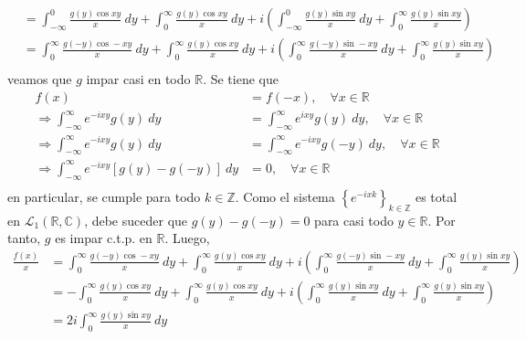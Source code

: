 \documentclass[12pt]{report}
\newcounter{it}
\theoremstyle{largebreak}
\begin{document}
\begin{sol}
\begin{equation*}
\begin{split}
                &=\int_{-\infty}^{0}\frac{g(y)\cos xy}{x}\:dy+\int_{0}^{\infty}\frac{g(y)\cos xy}{x}\:dy+i\left(\int_{-\infty}^{0}\frac{g(y)\sin xy}{x}\:dy+\int_{0}^{\infty}\frac{g(y)\sin xy}{x}\right)\\
                &=\int_{0}^{\infty}\frac{g(-y)\cos -xy}{x}\:dy+\int_{0}^{\infty}\frac{g(y)\cos xy}{x}\:dy+i\left(\int_{0}^{\infty}\frac{g(-y)\sin -xy}{x}\:dy+\int_{0}^{\infty}\frac{g(y)\sin xy}{x}\right)\\
            \end{split}
        \end{equation*}
        veamos que $g$ impar casi en todo $\mathbb{R}$. Se tiene que
        \begin{equation*}
            \begin{split}
                f(x)&=f(-x),\quad\forall x\in\mathbb{R}\\
                \Rightarrow \int_{-\infty}^{\infty}e^{ -ixy}g(y)\:dy&=\int_{-\infty}^{\infty}e^{ ixy}g(y)\:dy,\quad\forall x\in\mathbb{R}\\
                \Rightarrow \int_{-\infty}^{\infty}e^{ -ixy}g(y)\:dy&=\int_{-\infty}^{\infty}e^{-ixy}g(-y)\:dy,\quad\forall x\in\mathbb{R}\\
                \Rightarrow \int_{-\infty}^{\infty}e^{ -ixy}\left[g(y)-g(-y)\right]\:dy&=0,\quad\forall x\in\mathbb{R}\\
            \end{split}
        \end{equation*}
        en particular, se cumple para todo $k\in\mathbb{Z}$. Como el sistema $\left\{e^{ -ixk} \right\}_{k\in\mathbb{Z}}$ es total en $\mathcal{L}_1(\mathbb{R},\mathbb{C})$, debe suceder que $g(y)-g(-y)=0$ para casi todo $y\in\mathbb{R}$. Por tanto, $g$ es impar c.t.p. en $\mathbb{R}$. Luego,
        \begin{equation*}
            \begin{split}
                \frac{f(x)}{x}&=\int_{0}^{\infty}\frac{g(-y)\cos -xy}{x}\:dy+\int_{0}^{\infty}\frac{g(y)\cos xy}{x}\:dy+i\left(\int_{0}^{\infty}\frac{g(-y)\sin -xy}{x}\:dy+\int_{0}^{\infty}\frac{g(y)\sin xy}{x}\right)\\
                &=-\int_{0}^{\infty}\frac{g(y)\cos xy}{x}\:dy+\int_{0}^{\infty}\frac{g(y)\cos xy}{x}\:dy+i\left(\int_{0}^{\infty}\frac{g(y)\sin xy}{x}\:dy+\int_{0}^{\infty}\frac{g(y)\sin xy}{x}\right)\\
                &=2i\int_{0}^{\infty}\frac{g(y)\sin xy}{x}\:dy\\

\end{split}
\end{equation*}
\end{sol}
\end{document}
